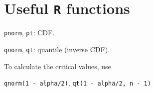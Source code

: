 \documentclass[12pt]{article}
\begin{document}
% 
% 
% 
% 
% 
% 
% 
% 

\section{Useful \texttt{R} functions}

\texttt{pnorm}, \texttt{pt}: CDF.

\texttt{qnorm}, \texttt{qt}: quantile (\ie inverse CDF).

To calculate the critical values, use

\texttt{qnorm(1 - alpha/2)},
\texttt{qt(1 - alpha/2, n - 1)}
\end{document}

